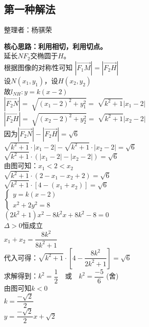 \documentclass[UTF8]{ctexart}
\begin{document}
\newpage

\subsection{第一种解法}
    \begin{center}
        整理者：杨骐荣
    \end{center}
    \begin{multicols}{2}
        \small
        \textbf{核心思路：利用相切，利用切点。}\\[5mm]
        延长$NF_2$交椭圆于$H$。\\[5mm]
        根据图像的对称性可知 $\left| {\overrightarrow{F_1M}}  \right | = \left | {\overrightarrow{F_2H}}  \right|$\\[5mm]
        设$N(x_1,y_1)$，设$H(x_2,y_2)$\\[5mm]
        故$l_{NH}:y=k(x-2)$\\[5mm]
        $\left | {\overrightarrow{F_2N}}  \right | =\sqrt[]{(x_1-2)^2+y_1^2} =\sqrt[]{k^2+1} \left | {x_1-2}  \right |$\\[5mm]
        $\left | {\overrightarrow{F_2H}}  \right | =\sqrt[]{(x_2-2)^2+y_2^2} =\sqrt[]{k^2+1} \left | {x_2-2}  \right |$\\[5mm]
        因为$\left | {\overrightarrow{F_2N}}  \right | -\left | {\overrightarrow{F_2H}}  \right |=\sqrt{6} $\\[5mm]
        $\sqrt{k^2+1}\cdot\left | {x_1-2}  \right |-\sqrt{k^2+1}\cdot\left | {x_2-2}  \right |=\sqrt{6} $\\[5mm]
        $\sqrt{k^2+1}\cdot(\left | {x_1-2}  \right |-\left | {x_2-2}  \right |)=\sqrt{6} $\\[5mm]
        由图可知：$x_1<2<x_2$\\[5mm]
        $\sqrt{k^2+1}\cdot(2-x_1-x_2+2)=\sqrt{6}$\\[5mm]
        $\sqrt{k^2+1}\cdot[4-(x_1+x_2)]=\sqrt{6} $\\[100mm]
        \begin{math}
            \begin{cases}
                y=k(x-2) \\[1mm]  
                x^2+2y^2=8 
            \end{cases}
        \end{math}\\[5mm]
        $(2k^2+1)x^2-8k^2x+8k^2-8=0$\\[5mm]
        $\Delta>0$恒成立\\[5mm]
        $x_1+x_2=\dfrac{8k^2}{8k^2+1}$\\[5mm]
        代入可得：$\sqrt{k^2+1}\cdot\left[4-\dfrac{8k^2}{2k^2+1}\right]=\sqrt{6}$\\[5mm]
        求解得到：$k^2=\dfrac{1}{2}$~~或~~$k^2=\dfrac{-5}{6}$ (舍)\\[5mm]
        由图可知$k<0$\\[5mm]
        $k=\dfrac{-\sqrt{2} }{2}$\\[5mm]
        $y=\dfrac{-\sqrt{2} }{2}x+\sqrt{2}$\\[5mm]
        \newpage
    \end{multicols}
\end{document}
